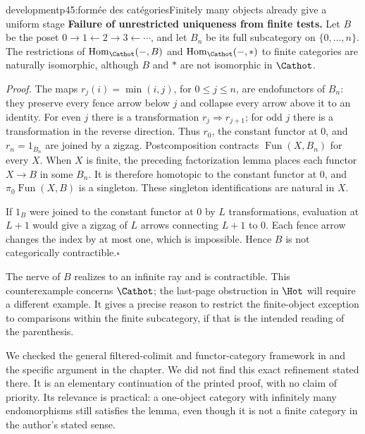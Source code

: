 \begin{dcomment}{development}{p45:formée des catégories}{Finitely many objects already give a uniform stage}
\textbf{Failure of unrestricted uniqueness from finite tests.}\ours\quad
Let $B$ be the poset $0\to1\leftarrow2\to3\leftarrow\cdots$, and let $B_n$ be its full subcategory on $\{0,\ldots,n\}$. The restrictions of $\operatorname{Hom}_{\Cathot}(-,B)$ and $\operatorname{Hom}_{\Cathot}(-,*)$ to finite categories are naturally isomorphic, although $B$ and $*$ are not isomorphic in $\Cathot$.

\textit{Proof.} The maps $r_j(i)=\min(i,j)$, for $0\leq j\leq n$, are endofunctors of $B_n$: they preserve every fence arrow below $j$ and collapse every arrow above it to an identity. For even $j$ there is a transformation $r_j\Rightarrow r_{j+1}$; for odd $j$ there is a transformation in the reverse direction. Thus $r_0$, the constant functor at $0$, and $r_n=1_{B_n}$ are joined by a zigzag. Postcomposition contracts $\operatorname{Fun}(X,B_n)$ for every $X$. When $X$ is finite, the preceding factorization lemma places each functor $X\to B$ in some $B_n$. It is therefore homotopic to the constant functor at $0$, and $\pi_0\operatorname{Fun}(X,B)$ is a singleton. These singleton identifications are natural in $X$.

If $1_B$ were joined to the constant functor at $0$ by $L$ transformations, evaluation at $L+1$ would give a zigzag of $L$ arrows connecting $L+1$ to $0$. Each fence arrow changes the index by at most one, which is impossible. Hence $B$ is not categorically contractible.\hfill$\square$

The nerve of $B$ realizes to an infinite ray and is contractible. This counterexample concerns $\Cathot$; the last-page obstruction in $\Hot$ will require a different example. It gives a precise reason to restrict the finite-object exception to comparisons within the finite subcategory, if that is the intended reading of the parenthesis.

We checked the general filtered-colimit and functor-category framework in \citet[Chapters~1 and 7]{Riehl2014} and the specific argument in the chapter. We did not find this exact refinement stated there. It is an elementary continuation of the printed proof, with no claim of priority. Its relevance is practical: a one-object category with infinitely many endomorphisms still satisfies the lemma, even though it is not a finite category in the author's stated sense.
\end{dcomment}

